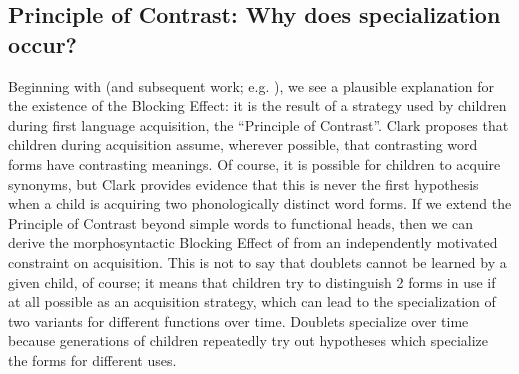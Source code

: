 \subsection{Principle of Contrast: Why does specialization occur?}

Beginning with \citet{clark1987} (and subsequent work; e.g. \citealt{clark1990}), we see a plausible explanation for the existence of the Blocking Effect: it is the result of a strategy used by children during first language acquisition, the ``Principle of Contrast''.
Clark proposes that children during acquisition assume, wherever possible, that contrasting word forms have contrasting meanings.
Of course, it is possible for children to acquire synonyms, but Clark provides evidence that this is never the first hypothesis when a child is acquiring two phonologically distinct word forms.
If we extend the Principle of Contrast beyond simple words to functional heads, then we can derive the morphosyntactic Blocking Effect of \citet{kroch1994} from an independently motivated constraint on acquisition.
This is not to say that doublets cannot be learned by a given child, of course; it means that children try to distinguish 2 forms in use if at all possible as an acquisition strategy, which can lead to the specialization of two variants for different functions over time.
Doublets specialize over time because generations of children repeatedly try out hypotheses which specialize the forms for different uses.

